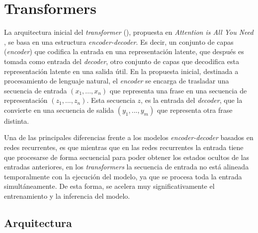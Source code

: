 \section{Transformers}
La arquitectura inicial del \textit{transformer} (), propuesta en \textit{Attention is All You Need} \cite{NIPS2017_3f5ee243}, se basa en una estructura \textit{encoder-decoder}. Es decir, un conjunto de capas (\textit{encoder}) que codifica la entrada en una representación latente, que después es tomada como entrada del \textit{decoder}, otro conjunto de capas que decodifica esta representación latente en una salida útil. En la propuesta inicial, destinada a procesamiento de lenguaje natural, el \textit{encoder} se encarga de trasladar una secuencia de entrada $(x_1, ..., x_n)$ que representa una frase en una secuencia de representación $(z_1, ..., z_n)$. Esta secuencia $z$, es la entrada del \textit{decoder}, que la convierte en una secuencia de salida $(y_1, ..., y_m)$ que representa otra frase distinta. 

Una de las principales diferencias frente a los modelos \textit{encoder-decoder} basados en redes recurrentes, es que mientras que en las redes recurrentes la entrada tiene que procesarse de forma secuencial para poder obtener los estados ocultos de las entradas anteriores, en los \textit{transformers} la secuencia de entrada no está alineada temporalmente con la ejecución del modelo, ya que se procesa toda la entrada simultáneamente. De esta forma, se acelera muy significativamente el entrenamiento y la inferencia del modelo.

\subsection{Arquitectura}

\vspace{2mm}

